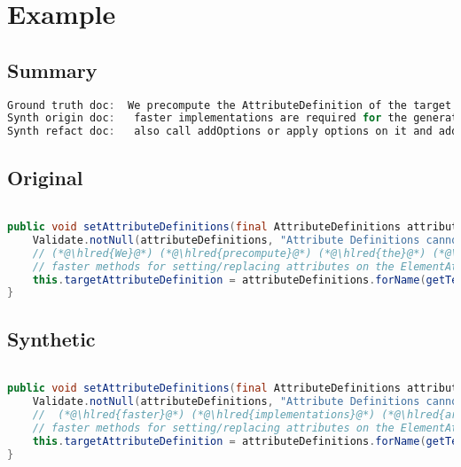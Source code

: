 \documentclass[11pt]{article}
\DeclareRobustCommand{\hlred}[1]{{\sethlcolor{YellowOrange}\hl{#1}}}
\begin{document}
  \pagebreak
  \section{Example}
  \subsection{Summary}

  \begin{lstlisting}[language=java]
Ground truth doc:  We precompute the AttributeDefinition of the target attribute in order to being able to use much
Synth origin doc:   faster implementations are required for the generation but cannot override or replace attributes instead of just
Synth refact doc:   also call addOptions or apply options on it and addTo instead to implement any
  \end{lstlisting}

  \subsection{Original}
  \begin{lstlisting}[language=java]

public void setAttributeDefinitions(final AttributeDefinitions attributeDefinitions) {
    Validate.notNull(attributeDefinitions, "Attribute Definitions cannot be null");
    // (*@\hlred{We}@*) (*@\hlred{precompute}@*) (*@\hlred{the}@*) (*@\hlred{AttributeDefinition}@*) (*@\hlred{of}@*) the (*@\hlred{target}@*) (*@\hlred{attribute}@*) (*@\hlred{in}@*) (*@\hlred{order}@*) (*@\hlred{to}@*) (*@\hlred{being}@*) (*@\hlred{able}@*) (*@\hlred{to}@*) (*@\hlred{use}@*) (*@\hlred{much}@*)
    // faster methods for setting/replacing attributes on the ElementAttributes implementation
    this.targetAttributeDefinition = attributeDefinitions.forName(getTemplateMode(), this.targetAttrCompleteName);
}
  \end{lstlisting}
  \subsection{Synthetic}

  \begin{lstlisting}[language=java]

public void setAttributeDefinitions(final AttributeDefinitions attributeDefinitions) {
    Validate.notNull(attributeDefinitions, "Attribute Definitions cannot be null");
    //  (*@\hlred{faster}@*) (*@\hlred{implementations}@*) (*@\hlred{are}@*) (*@\hlred{required}@*) (*@\hlred{for}@*) the (*@\hlred{generation}@*) (*@\hlred{but}@*) (*@\hlred{cannot}@*) (*@\hlred{override}@*) (*@\hlred{or}@*) (*@\hlred{replace}@*) (*@\hlred{attributes}@*) (*@\hlred{instead}@*) (*@\hlred{of}@*) (*@\hlred{just}@*)
    // faster methods for setting/replacing attributes on the ElementAttributes implementation
    this.targetAttributeDefinition = attributeDefinitions.forName(getTemplateMode(), this.targetAttrCompleteName);
}
  \end{lstlisting}
\end{document}
